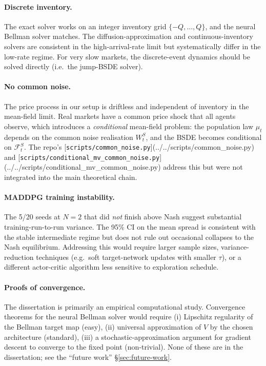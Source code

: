 \paragraph{Discrete inventory.}  The exact solver works on an integer inventory grid $\{-Q, \ldots, Q\}$, and the neural Bellman solver matches. The diffusion-approximation and continuous-inventory solvers are consistent in the high-arrival-rate limit but systematically differ in the low-rate regime. For very slow markets, the discrete-event dynamics should be solved directly (i.e.\ the jump-BSDE solver).

\paragraph{No common noise.}  The price process in our setup is driftless and independent of inventory in the mean-field limit. Real markets have a common price shock that all agents observe, which introduces a \emph{conditional} mean-field problem: the population law $\mu_t$ depends on the common noise realisation $W^S_t$, and the BSDE becomes conditional on $\mathcal{F}^S_t$. The repo's [\texttt{scripts/common\_noise.py}](../../scripts/common_noise.py) and [\texttt{scripts/conditional\_mv\_common\_noise.py}](../../scripts/conditional_mv_common_noise.py) address this but were not integrated into the main theoretical chain.

\paragraph{MADDPG training instability.}  The 5/20 seeds at $N = 2$ that did \emph{not} finish above Nash suggest substantial training-run-to-run variance. The 95\% CI on the mean spread is consistent with the stable intermediate regime but does not rule out occasional collapses to the Nash equilibrium. Addressing this would require larger sample sizes, variance-reduction techniques (e.g.\ soft target-network updates with smaller $\tau$), or a different actor-critic algorithm less sensitive to exploration schedule.

\paragraph{Proofs of convergence.}  The dissertation is primarily an empirical computational study. Convergence theorems for the neural Bellman solver would require (i) Lipschitz regularity of the Bellman target map (easy), (ii) universal approximation of $V$ by the chosen architecture (standard), (iii) a stochastic-approximation argument for gradient descent to converge to the fixed point (non-trivial). None of these are in the dissertation; see the ``future work'' \S\ref{sec:future-work}.

